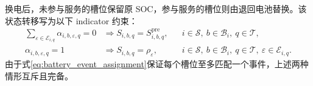 \documentclass[12pt,a4paper,UTF8]{ctexart}
\begin{document}
换电后，未参与服务的槽位保留原 SOC，参与服务的槽位则由退回电池替换。该状态转移写为以下 indicator 约束：
\begin{subequations}
\label{eq:continuous_swap_transition}
\begin{align}
\sum_{\varepsilon\in\mathcal E_{i,q}}\alpha_{i,b,\varepsilon,q}=0
&\Longrightarrow
S_{i,b,q}=S_{i,b,q}^{\mathrm{pre}},
&&i\in\mathcal S,\ b\in\mathcal B_i,\ q\in\mathcal T,\\
\alpha_{i,b,\varepsilon,q}=1
&\Longrightarrow
S_{i,b,q}=\rho_\varepsilon,
&&i\in\mathcal S,\ b\in\mathcal B_i,\ q\in\mathcal T,
\ \varepsilon\in\mathcal E_{i,q}.
\end{align}
\end{subequations}
由于式\eqref{eq:battery_event_assignment}保证每个槽位至多匹配一个事件，上述两种情形互斥且完备。
\end{document}
